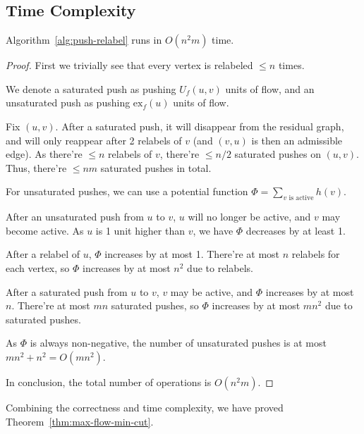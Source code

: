 \subsection{Time Complexity}
\begin{lemma}
  Algorithm~\ref{alg:push-relabel} runs in $O(n^2m)$ time.
\end{lemma}
\begin{proof}
  First we trivially see that every vertex is relabeled $\le n$ times.

  We denote a saturated push as pushing $U_f(u,v)$ units of flow, and an unsaturated push as pushing $\text{ex}_f(u)$ units of flow.

  Fix $(u,v)$. After a saturated push, it will disappear from the residual graph, and will only reappear after 2 relabels of $v$ (and $(v,u)$ is then an admissible edge). As there're $\le n$ relabels of $v$, there're $\le n/2$ saturated pushes on $(u,v)$.
  Thus, there're $\le nm$ saturated pushes in total.

  For unsaturated pushes, we can use a potential function $\Phi = \sum_{v \text{ is active}} h(v)$. 

  After an unsaturated push from $u$ to $v$, $u$ will no longer be active, and $v$ may become active.
  As $u$ is 1 unit higher than $v$, we have $\Phi$ decreases by at least 1.

  After a relabel of $u$, $\Phi$ increases by at most 1. There're at most $n$ relabels for each vertex, so $\Phi$ increases by at most $n^2$ due to relabels.

  After a saturated push from $u$ to $v$, $v$ may be active, and $\Phi$ increases by at most $n$. There're at most $mn$ saturated pushes, so $\Phi$ increases by at most $mn^2$ due to saturated pushes.

  As $\Phi$ is always non-negative, the number of unsaturated pushes is at most $mn^2 + n^2 = O(mn^2)$.

  In conclusion, the total number of operations is $O(n^2m)$.
\end{proof}

Combining the correctness and time complexity, we have proved Theorem~\ref{thm:max-flow-min-cut}.

